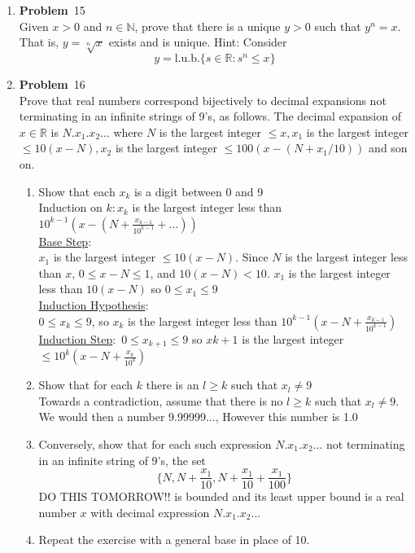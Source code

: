 \documentclass[12pt]{amsart}
\newcommand{\benu}{\begin{enumerate}}
\newcommand{\eenu}{\end{enumerate}}
\theoremstyle{definition}
\newcommand{\mbR}{\mathbb{R}}
\newcommand{\mbN}{\mathbb{N}}
\newcommand{\itep}{\item {\bfseries Problem}\ }
\begin{document}
\begin{enumerate}[series=p]
\newpage
\itep 15\\
Given $x > 0$ and $n \in \mbN$, prove that there is a unique $y > 0$ such that $y^n = x$.  That is, $y = \sqrt[n]{x}$ exists and is unique.  Hint: Consider
$$y = \text{l.u.b.}\{s \in \mbR : s^n \leq x\}$$

\newpage
\itep 16\\
Prove that real numbers correspond bijectively  to decimal expansions not terminating in an infinite strings of 9's, as follows.  The decimal expansion of $x \in \mbR$ is $N.x_1.x_2\dots$ where $N$ is the largest integer $\leq x, x_1$ is the largest integer $\leq 10(x-N), x_2$ is the largest integer $\leq 100(x-(N+x_1/10))$ and son on.
\\
\benu
\item Show that each $x_k$ is a digit between 0 and 9
\\
Induction on $k: x_k$ is the largest integer less than $10^{k-1}(x-(N  + \frac{x_{k-1}}{10^{k-1}}+ \dots))$
\\\underline{Base Step}:\\
$x_1$ is the largest integer $\leq 10(x - N)$. Since $N$ is the largest integer less than $x$, $0 \leq x - N \leq 1$, and $10(x - N) < 10$.  $x_1$ is the largest integer less than $10(x -N)$ so $0 \leq x_1 \leq 9$
\\
\underline{Induction Hypothesis}:\\
$0 \leq x_k \leq 9$, so $x_k$ is the largest integer less than $10^{k-1}(x-N+\frac{x_{k-1}}{10^{k-1}})$
\\
\underline{Induction Step}:\
$0 \leq x_{k+1} \leq 9$ so $x{k+1}$ is the largest integer $\leq 10^k(x - N + \frac{x_k}{10^k})$

\item Show that for each $k$ there is an $l \geq k$ such that $x_l \neq 9$
\\
Towards a contradiction, assume that there is no $l \geq k$ such that $x_l \neq 9$.  We would then a number 9.99999..., However this number is 1.0\hfill\lightning
\\
\item Conversely, show that for each such expression $N.x_1.x_2\dots$ not terminating in an infinite string of 9's, the set
$$ \{N, N + \frac{x_1}{10}, N + \frac{x_1}{10} + \frac{x_1}{100}\}$$ DO THIS TOMORROW!!
is bounded and its least upper bound is a real number $x$ with decimal expression $N.x_1.x_2\dots$
\\
\item Repeat the exercise with a general base in place of 10.
\eenu


\end{enumerate}
\end{document}
